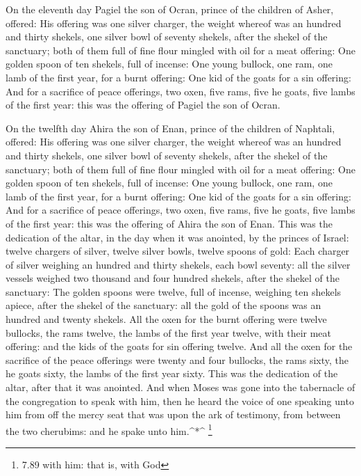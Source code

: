  On the eleventh day Pagiel the son of Ocran, prince of the
children of Asher, offered:  His offering was one silver
charger, the weight whereof was an hundred and thirty shekels, one
silver bowl of seventy shekels, after the shekel of the sanctuary; both
of them full of fine flour mingled with oil for a meat offering:
 One golden spoon of ten shekels, full of incense:
 One young bullock, one ram, one lamb of the first year,
for a burnt offering:  One kid of the goats for a sin
offering:  And for a sacrifice of peace offerings, two
oxen, five rams, five he goats, five lambs of the first year: this was
the offering of Pagiel the son of Ocran.

 On the twelfth day Ahira the son of Enan, prince of the
children of Naphtali, offered:  His offering was one silver
charger, the weight whereof was an hundred and thirty shekels, one
silver bowl of seventy shekels, after the shekel of the sanctuary; both
of them full of fine flour mingled with oil for a meat offering:
 One golden spoon of ten shekels, full of incense:
 One young bullock, one ram, one lamb of the first year,
for a burnt offering:  One kid of the goats for a sin
offering:  And for a sacrifice of peace offerings, two
oxen, five rams, five he goats, five lambs of the first year: this was
the offering of Ahira the son of Enan.  This was the
dedication of the altar, in the day when it was anointed, by the princes
of Israel: twelve chargers of silver, twelve silver bowls, twelve spoons
of gold:  Each charger of silver weighing an hundred and
thirty shekels, each bowl seventy: all the silver vessels weighed two
thousand and four hundred shekels, after the shekel of the sanctuary:
 The golden spoons were twelve, full of incense, weighing
ten shekels apiece, after the shekel of the sanctuary: all the gold of
the spoons was an hundred and twenty shekels.  All the oxen
for the burnt offering were twelve bullocks, the rams twelve, the lambs
of the first year twelve, with their meat offering: and the kids of the
goats for sin offering twelve.  And all the oxen for the
sacrifice of the peace offerings were twenty and four bullocks, the rams
sixty, the he goats sixty, the lambs of the first year sixty. This was
the dedication of the altar, after that it was anointed. 
And when Moses was gone into the tabernacle of the congregation to speak
with him, then he heard the voice of one speaking unto him from off the
mercy seat that was upon the ark of testimony, from between the two
cherubims: and he spake unto him.\^{}*\^{} \footnote{7.89 with him: that
  is, with God}

